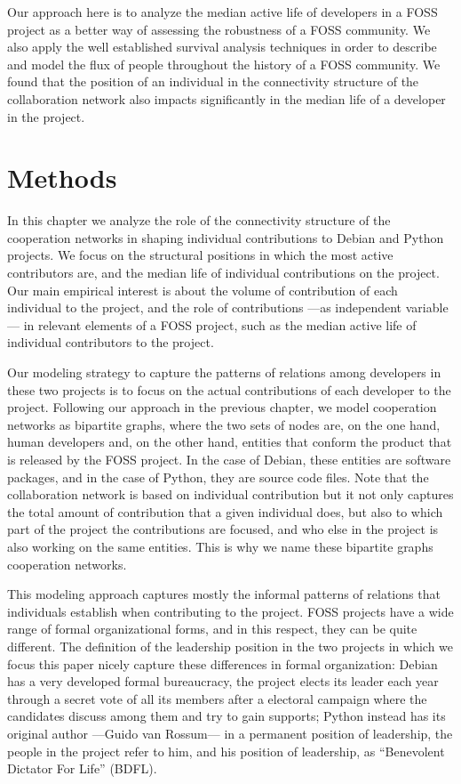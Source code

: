 Our approach here is to analyze the median active life of developers in a FOSS project as a better way of assessing the robustness of a FOSS community. We also apply the well established survival analysis techniques \citep{miller:2011} in order to describe and model the flux of people throughout the history of a FOSS community.  We found that the position of an individual in the connectivity structure of the collaboration network also impacts significantly in the median life of a developer in the project.

\section{Methods}

In this chapter we analyze the role of the connectivity structure of the cooperation networks in shaping individual contributions to Debian and Python projects. We focus on the structural positions in which the most active contributors are, and the median life of individual contributions on the project. Our main empirical interest is about the volume of contribution of each individual to the project, and the role of contributions ---as independent variable--- in relevant elements of a FOSS project, such as the median active life of individual contributors to the project.

Our modeling strategy to capture the patterns of relations among developers in these two projects is to focus on the actual contributions of each developer to the project. Following our approach in the previous chapter, we model cooperation networks as bipartite graphs, where the two sets of nodes are, on the one hand, human developers and, on the other hand, entities that conform the product that is released by the FOSS project. In the case of Debian, these entities are software packages, and in the case of Python, they are source code files. Note that the collaboration network is based on individual contribution but it not only captures the total amount of contribution that a given individual does, but also to which part of the project the contributions are focused, and who else in the project is also working on the same entities. This is why we name these bipartite graphs cooperation networks.

This modeling approach captures mostly the informal patterns of relations that individuals establish when contributing to the project. FOSS projects have a wide range of formal organizational forms, and in this respect, they can be quite different. The definition of the leadership position in the two projects in which we focus this paper nicely capture these differences in formal organization: Debian has a very developed formal bureaucracy, the project elects its leader each year through a secret vote of all its members after a electoral campaign where the candidates discuss among them and try to gain supports; Python instead has its original author ---Guido van Rossum--- in a permanent position of leadership, the people in the project refer to him, and his position of leadership, as ``Benevolent Dictator For Life'' (BDFL).

